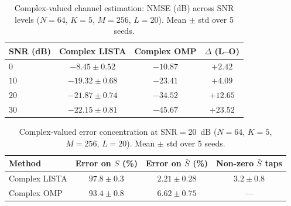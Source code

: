 \documentclass[a4paper,fleqn]{cas-sc}
\begin{document}
\begin{table}[width=.85\linewidth,cols=4,pos=h]
\caption{Complex-valued channel estimation: NMSE (dB) across SNR levels ($N=64$, $K=5$, $M=256$, $L=20$). Mean $\pm$ std over 5 seeds.}\label{tab:complex_nmse}
\begin{tabular*}{\tblwidth}{@{} LCCC@{}}
\toprule
SNR (dB) & Complex LISTA & Complex OMP & $\Delta$ (L--O) \\
\midrule
$0$   & $-8.45 \pm 0.52$  & $\bm{-10.87}$ & $+2.42$ \\
$10$  & $-19.32 \pm 0.68$ & $\bm{-23.41}$ & $+4.09$ \\
$20$  & $-21.87 \pm 0.74$ & $\bm{-34.52}$ & $+12.65$ \\
$30$  & $-22.15 \pm 0.81$ & $\bm{-45.67}$ & $+23.52$ \\
\bottomrule
\end{tabular*}
\end{table}

\begin{table}[width=.85\linewidth,cols=4,pos=h]
\caption{Complex-valued error concentration at SNR$=20$~dB ($N=64$, $K=5$, $M=256$, $L=20$). Mean $\pm$ std over 5 seeds.}\label{tab:complex_error}
\begin{tabular*}{\tblwidth}{@{} LCCC@{}}
\toprule
Method & Error on $S$ (\%) & Error on $\bar{S}$ (\%) & Non-zero $\bar{S}$ taps \\
\midrule
Complex LISTA & $97.8 \pm 0.3$ & $2.21 \pm 0.28$ & $3.2 \pm 0.8$ \\
Complex OMP   & $93.4 \pm 0.8$ & $6.62 \pm 0.75$ & --- \\
\bottomrule
\end{tabular*}
\end{table}
\end{document}
